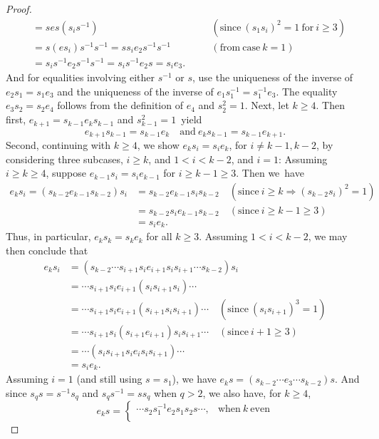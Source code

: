 \documentclass{surv-l}
\numberwithin{equation}{section}
\numberwithin{table}{section}
\numberwithin{figure}{section}
\theoremstyle{plain}
\theoremstyle{definition}
\begin{document}
\begin{proof}
\begin{align*}
&=ses(s_{i}s^{-1})&& (\mathrm{since}\ (s_{1}s_{i})^{2}=1\ \mathrm{for}\ i\geq 3) \\
&=s(es_{i})s^{-1}s^{-1}=ss_{i}e_{2}s^{-1}s^{-1}&& (\mathrm{from\ case}\ k=1) \\
&=s_{i}s^{-1}e_{2}s^{-1}s^{-1}=s_{i}s^{-1}e_{2}s=s_{i}e_{3}.\quad&&
\end{align*}
And for equalities involving either $s^{-1}$ or $s$, use the
uniqueness of the inverse of $e_{2}s_{1}=s_{1}e_{3}$ and the
uniqueness of the inverse of
$e_{1}s_{1}^{-1}=s_{1}^{-1}e_{3}$. The equality
$e_{3}s_{2}=s_{2}e_{4}$ follows from the definition of $e_{4}$
and $s_{2}^{2}=1$. Next, let $k\geq 4$. Then first,
$e_{k+1}=s_{k-1}e_{k}s_{k-1}$ and $s_{k-1}^{2}=1$~yield
\[
e_{k+1}s_{k-1}=s_{k-1}e_{k}\quad \mathrm{and}\ e_{k}s_{k-1}=s_{k-1}e_{k+1}.
\]
Second, continuing with $k\geq 4$, we show
$e_{k}s_{i}=s_{i}e_{k}$, for $i\neq k-1, k-2$, by considering
three subcases, $i\geq k$, and $1<i<k-2$, and $i=1$: Assuming
$i\geq k\geq 4$, suppose $e_{k-1}s_{i}=s_{i}e_{k-1}$ for
$i\geq k-1 \geq 3$. Then we~have
\begin{align*}
e_{k}s_{i}=(s_{k-2}e_{k-1}s_{k-2})s_{i} &=s_{k-2}e_{k-1}s_{i}s_{k-2}\quad
(\mathrm{since}\ i\geq k\Rightarrow(s_{k-2}s_{i})^{2}=1) \\
&=s_{k-2}s_{i}e_{k-1}s_{k-2}\quad (\mathrm{since}\ i\geq k-1\geq 3) \\
&=s_{i}e_{k}.
\end{align*}
Thus, in particular, $e_{k}s_{k}=s_{k}e_{k}$ for all $k\geq 3$.
Assuming $1<i<k-2$, we may then conclude that
\begin{align*}
e_{k}s_{i}&=(s_{k-2}\cdots s_{i+1}s_{i}e_{i+1}s_i s_{i+1}\cdots s_{k-2})s_{i} \\
&=\cdots s_{i+1}s_{i}e_{i+1}(s_{i}s_{i+1}s_{i})\cdots \\
&=\cdots s_{i+1}s_{i}e_{i+1}(s_{i+1}s_{i}s_{i+1})\cdots\quad (\mathrm{since}\
(s_{i}s_{i+1})^{3}=1) \\
&=\cdots s_{i+1}s_{i}(s_{i+1}e_{i+1})s_{i}s_{i+1}\cdots\quad (\mathrm{since}\ i+1\geq 3) \\
&=\cdots(s_is_{i+1}s_ie_is_is_{i+1})\cdots \\
&=s_{i}e_{k}.
\end{align*}
Assuming $i=1$ (and still using $s=s_{1}$), we have
$e_{k}s=(s_{k-2}\cdots e_{3}\cdots s_{k-2})s$. And since
$s_{q}s=s^{-1}s_{q}$ and $s_{q}s^{-1}=ss_{q}$ when $q>2$, we also
have, for $k\geq 4$,
\[
e_{k}s=\begin{cases}
\cdots s_{2}s_{1}^{-1}e_{2}s_{1}s_{2}s\cdots, &\mathrm{when}\ k\ \mathrm{even}\\

\end{cases}\]
\end{proof}
\end{document}
